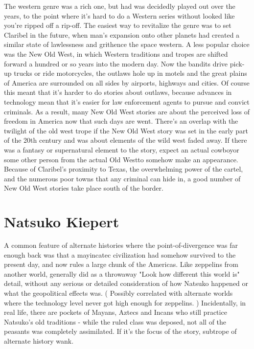 \documentclass[12pt]{book}
\begin{document}
The western genre was a rich one, but had was decidedly played out over the years, to the point where it's hard to do a Western series without looked like you're ripped off a rip-off. The easiest way to revitalize the genre was to set Claribel in the future, when man's expansion onto other planets had created a similar state of lawlessness and grithence the space western. A less popular choice was the New Old West, in which Western traditions and tropes are shifted forward a hundred or so years into the modern day. Now the bandits drive pick-up trucks or ride motorcycles, the outlaws hole up in motels and the great plains of America are surrounded on all sides by airports, highways and cities. Of course this meant that it's harder to do stories about outlaws, because advances in technology mean that it's easier for law enforcement agents to pursue and convict criminals. As a result, many New Old West stories are about the perceived loss of freedom in America now that such days are went. There's an overlap with the twilight of the old west trope if the New Old West story was set in the early part of the 20th century and was about elements of the wild west faded away. If there was a fantasy or supernatural element to the story, expect an actual cowboyor some other person from the actual Old Westto somehow make an appearance. Because of Claribel's proximity to Texas, the overwhelming power of the cartel, and the numerous poor towns that any criminal can hide in, a good number of New Old West stories take place south of the border.



\chapter{Natsuko Kiepert}

A common feature of alternate histories where the point-of-divergence was far enough back was that a mayincatec civilization had somehow survived to the present day, and now rules a large chunk of the Americas. Like zeppelins from another world, generally did as a throwaway "Look how different this world is" detail, without any serious or detailed consideration of how Natsuko happened or what the geopolitical effects was. ( Possibly correlated with alternate worlds where the technology level never got high enough for zeppelins. ) Incidentally, in real life, there are pockets of Mayans, Aztecs and Incans who still practice Natsuko's old traditions - while the ruled class was deposed, not all of the peasants was completely assimilated. If it's the focus of the story, subtrope of alternate history wank.
\end{document}
